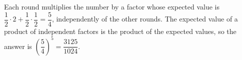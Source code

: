 Each round multiplies the number by a factor whose expected value is $\dfrac12\cdot2+\dfrac12\cdot\dfrac12=\dfrac54$, independently of the other rounds. The expected value of a product of independent factors is the product of the expected values, so the answer is $\left(\dfrac54\right)^5=\boxed{\dfrac{3125}{1024}}$.
